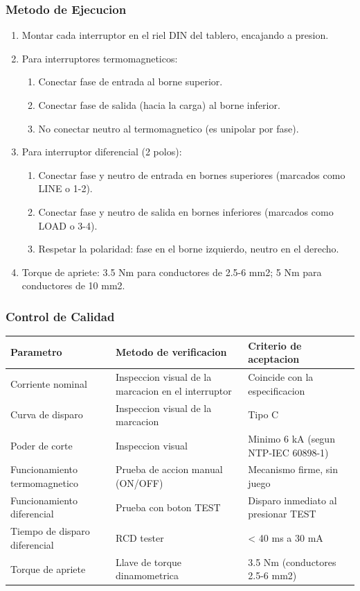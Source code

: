 \subsubsection{Metodo de Ejecucion}

\begin{enumerate}
  \item Montar cada interruptor en el riel DIN del tablero, encajando a presion.
  \item Para interruptores termomagneticos:
  \begin{enumerate}
    \item Conectar fase de entrada al borne superior.
    \item Conectar fase de salida (hacia la carga) al borne inferior.
    \item No conectar neutro al termomagnetico (es unipolar por fase).
  \end{enumerate}
  \item Para interruptor diferencial (2 polos):
  \begin{enumerate}
    \item Conectar fase y neutro de entrada en bornes superiores (marcados como LINE o 1-2).
    \item Conectar fase y neutro de salida en bornes inferiores (marcados como LOAD o 3-4).
    \item Respetar la polaridad: fase en el borne izquierdo, neutro en el derecho.
  \end{enumerate}
  \item Torque de apriete: 3.5 Nm para conductores de 2.5-6 mm2; 5 Nm para conductores de 10 mm2.
\end{enumerate}

\subsubsection{Control de Calidad}

\begin{longtable}{L{4.5cm} L{4.5cm} L{4.5cm}}
\toprule
\textbf{Parametro} & \textbf{Metodo de verificacion} & \textbf{Criterio de aceptacion} \\
\midrule
Corriente nominal & Inspeccion visual de la marcacion en el interruptor & Coincide con la especificacion \\
Curva de disparo & Inspeccion visual de la marcacion & Tipo C \\
Poder de corte & Inspeccion visual & Minimo 6 kA (segun NTP-IEC 60898-1) \\
Funcionamiento termomagnetico & Prueba de accion manual (ON/OFF) & Mecanismo firme, sin juego \\
Funcionamiento diferencial & Prueba con boton TEST & Disparo inmediato al presionar TEST \\
Tiempo de disparo diferencial & RCD tester & < 40 ms a 30 mA \\
Torque de apriete & Llave de torque dinamometrica & 3.5 Nm (conductores 2.5-6 mm2) \\
\bottomrule
\end{longtable}

